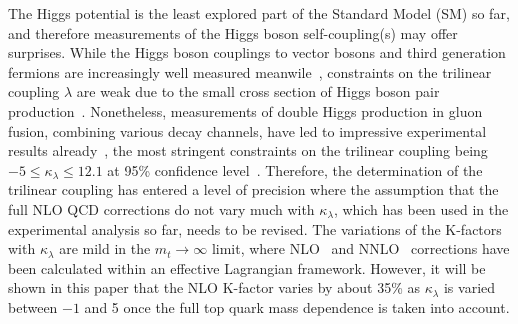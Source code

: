 The Higgs potential is the least explored part of the Standard Model (SM) so far, and therefore measurements of the Higgs boson self-coupling(s) may offer surprises.
While the Higgs boson couplings to vector bosons and third generation fermions are increasingly well measured meanwile~\cite{Khachatryan:2016vau,Aaboud:2017vzb,ATLAS:2018doi,Sirunyan:2018koj,Sirunyan:2018sgc}, constraints on the trilinear coupling $\lambda$ are weak due to the small cross section of Higgs boson pair production~\cite{Glover:1987nx,Dawson:1998py,Baglio:2012np,Frederix:2014hta,Borowka:2016ehy,Borowka:2016ypz,Baglio:2018lrj}.
Nonetheless, measurements of double Higgs production in gluon fusion, combining various decay channels,  have led to impressive experimental results already~\cite{Sirunyan:2018two,ATLAS-CONF-2018-043}, 
the most stringent constraints on the trilinear coupling being $-5\leq \kappa_\lambda\leq 12.1$
 at 95\% confidence level~\cite{ATLAS-CONF-2018-043}.
Therefore, the determination of the trilinear coupling has entered a level of precision where the assumption that the full NLO QCD corrections do not vary much with $\kappa_\lambda$, which has been used in the experimental analysis so far, needs to be revised.
The variations of the K-factors with $\kappa_\lambda$ are mild in the $m_t\to \infty$ limit, where NLO~\cite{Grober:2015cwa,Grober:2017gut} and NNLO~\cite{deFlorian:2017qfk} corrections have been calculated within an effective Lagrangian framework.
However, it will be shown in this paper that the NLO K-factor varies by about 35\% as $\kappa_\lambda$ is varied between $-1$ and 5 once the full top quark mass dependence is taken into account. 



